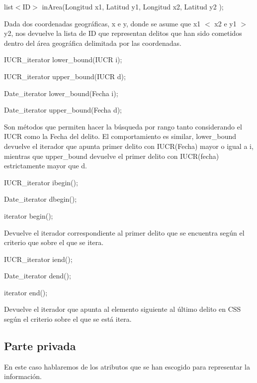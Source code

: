 \begin{DoxyItemize}
\item list$<$\+I\+D$>$ in\+Area(\+Longitud x1, Latitud y1, Longitud x2, Latitud y2 );\end{DoxyItemize}
Dada dos coordenadas geográficas, x e y, donde se asume que x1 $<$ x2 e y1 $>$ y2, nos devuelve la lista de I\+D que representan delitos que han sido cometidos dentro del área geográfica delimitada por las coordenadas.

\begin{DoxyItemize}
\item I\+U\+C\+R\+\_\+iterator lower\+\_\+bound(\+I\+U\+C\+R i); \item I\+U\+C\+R\+\_\+iterator upper\+\_\+bound(\+I\+U\+C\+R d); \item Date\+\_\+iterator lower\+\_\+bound(\+Fecha i); \item Date\+\_\+iterator upper\+\_\+bound(\+Fecha d);\end{DoxyItemize}
Son métodos que permiten hacer la búsqueda por rango tanto considerando el I\+U\+C\+R como la Fecha del delito. El comportamiento es similar, lower\+\_\+bound devuelve el iterador que apunta primer delito con I\+U\+C\+R(\+Fecha) mayor o igual a i, mientras que upper\+\_\+bound devuelve el primer delito con I\+U\+C\+R(fecha) estrictamente mayor que d.

\begin{DoxyItemize}
\item I\+U\+C\+R\+\_\+iterator ibegin(); \item Date\+\_\+iterator dbegin(); \item iterator begin();\end{DoxyItemize}
Devuelve el iterador correspondiente al primer delito que se encuentra según el criterio que sobre el que se itera.

\begin{DoxyItemize}
\item I\+U\+C\+R\+\_\+iterator iend(); \item Date\+\_\+iterator dend(); \item iterator end();\end{DoxyItemize}
Devuelve el iterador que apunta al elemento siguiente al último delito en C\+S\+S según el criterio sobre el que se está itera.\hypertarget{index_privado}{}\subsection{Parte privada}\label{index_privado}
En este caso hablaremos de los atributos que se han escogido para representar la información.


